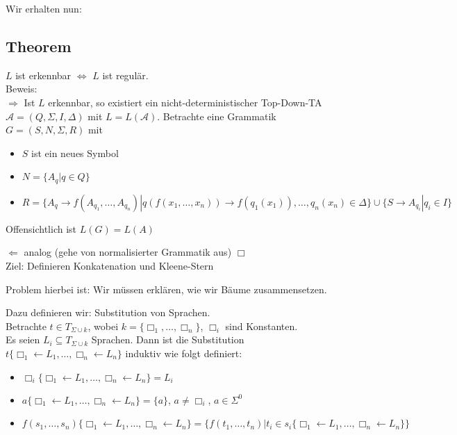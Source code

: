 \documentclass[titlepage]{article}
\begin{document}
Wir erhalten nun:

\subsection{Theorem}

$L$ ist erkennbar $\Leftrightarrow$ $L$ ist regul\"ar.\\

Beweis:\\
\glqq $\Rightarrow$ \grqq
Ist $L$ erkennbar, so existiert ein nicht-deterministischer Top-Down-TA 
$\mathcal{A} = (Q, \Sigma, I, \Delta)$ mit $L = L(\mathcal{A})$.
Betrachte eine Grammatik $G = (S, N, \Sigma, R)$ mit
\begin{itemize}
    \item $S$ ist ein neues Symbol
    \item $N = \{ A_q | q \in Q\}$
    \item $R = \{ A_q \to f(A_{q_1}, \dots, A_{q_n}) | 
        q(f(x_1, \dots, x_n)) \to f(q_1(x_1)), \dots, q_n(x_n) \in \Delta \} \cup 
        \{ S \to A_{q_i} | q_i \in I \}$
\end{itemize}

Offensichtlich ist $L(G) = L(A)$

\glqq $\Leftarrow$ \grqq analog (gehe von normalisierter Grammatik aus) $\Box$\\

Ziel: Definieren Konkatenation und Kleene-Stern

Problem hierbei ist: Wir m\"ussen erkl\"aren, wie wir B\"aume zusammensetzen.

Dazu definieren wir: Substitution von Sprachen.\\

Betrachte $t \in T_{\Sigma \cup k}$, wobei $k = \{\Box_1, \dots, \Box_n\}$, 
$\Box_i$ sind Konstanten.\\
Es seien $L_i \subseteq T_{\Sigma \cup k}$ Sprachen. Dann ist die Substitution
$t\{ \Box_1 \leftarrow L_1, \dots, \Box_n \leftarrow L_n \}$ induktiv wie folgt definiert:
\begin{itemize}
    \item $\Box_i\{ \Box_1 \leftarrow L_1, \dots, \Box_n \leftarrow L_n \} = L_i$
    \item $a\{ \Box_1 \leftarrow L_1, \dots, \Box_n \leftarrow L_n \} = \{a\}$, $a \neq \Box_i$, $a \in \Sigma^0$
    \item $f(s_1, \dots, s_n)\{ \Box_1 \leftarrow L_1, \dots, \Box_n \leftarrow L_n \} = 
        \{f(t_1, \dots, t_n) | t_i \in s_i\{ \Box_1 \leftarrow L_1, \dots, \Box_n \leftarrow L_n \} \}$
\end{itemize}
\end{document}
